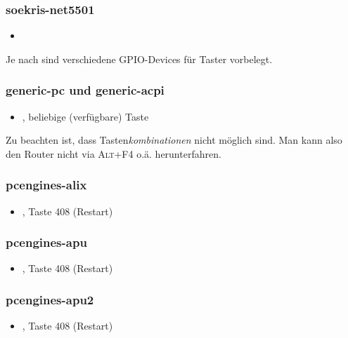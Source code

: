 \subsubsection{soekris-net5501}
\begin{itemize}
  \item {}
\end{itemize}

Je nach  sind verschiedene GPIO-Devices für Taster vorbelegt.

\subsubsection{generic-pc und generic-acpi}
\begin{itemize}
  \item {}, beliebige (verfügbare) Taste
\end{itemize}

Zu beachten ist, dass Tasten\emph{kombinationen} nicht möglich sind. Man kann
also den Router nicht via \textsc{Alt+F4} o.ä. herunterfahren.

\subsubsection{pcengines-alix}
\begin{itemize}
  \item {}, Taste 408 (Restart)
\end{itemize}

\subsubsection{pcengines-apu}
\begin{itemize}
  \item {}, Taste 408 (Restart)
\end{itemize}

\subsubsection{pcengines-apu2}
\begin{itemize}
  \item {}, Taste 408 (Restart)
\end{itemize}

